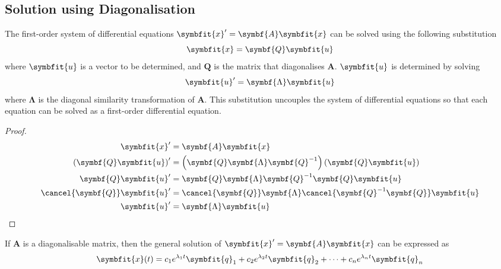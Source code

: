 \documentclass{article}
\begin{document}
\subsection{Solution using Diagonalisation}
\begin{theorem}
    The first-order system of differential equations
    \(\symbfit{x}' = \symbf{A} \symbfit{x}\) can be solved using the
    following substitution
    \begin{equation*}
        \symbfit{x}=\symbf{Q}\symbfit{u}
    \end{equation*}
    where \(\symbfit{u}\) is a vector to be determined, and
    \(\symbf{Q}\) is the matrix that diagonalises \(\symbf{A}\).
    \(\symbfit{u}\) is determined by solving
    \begin{equation*}
        \symbfit{u}' = \symbf{\Lambda} \symbfit{u}
    \end{equation*}
    where \(\symbf{\Lambda}\) is the diagonal similarity
    transformation of \(\symbf{A}\). This substitution uncouples the
    system of differential equations so that each equation can be solved
    as a first-order differential equation.
\end{theorem}
\begin{proof}
    \begingroup
    \allowdisplaybreaks
    \begin{align*}
        \symbfit{x}'                         & = \symbf{A} \symbfit{x}                                                                     \\
        \left( \symbf{Q}\symbfit{u} \right)' & = \left( \symbf{Q}\symbf{\Lambda} \symbf{Q}^{-1} \right)\left( \symbf{Q}\symbfit{u} \right) \\
        \symbf{Q}\symbfit{u}'                & = \symbf{Q}\symbf{\Lambda} \symbf{Q}^{-1} \symbf{Q}\symbfit{u}                              \\
        \cancel{\symbf{Q}}\symbfit{u}'       & = \cancel{\symbf{Q}}\symbf{\Lambda} \cancel{\symbf{Q}^{-1} \symbf{Q}}\symbfit{u}            \\
        \symbfit{u}'                         & = \symbf{\Lambda} \symbfit{u}
    \end{align*}
    \endgroup
\end{proof}
\begin{theorem}
    If \(\symbf{A}\) is a diagonalisable matrix, then the general
    solution of \(\symbfit{x}' = \symbf{A} \symbfit{x}\) can be
    expressed as
    \begin{equation*}
        \symbfit{x}(t) = c_1 e^{\lambda_1 t} \symbfit{q}_1 + c_2 e^{\lambda_2 t} \symbfit{q}_2 + \cdots + c_n e^{\lambda_n t} \symbfit{q}_n
    \end{equation*}
\end{theorem}
\end{document}
